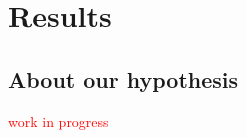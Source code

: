 \section{Results} \label{S:results}
%
\subsection{About our hypothesis} \label{sS:results_hypothesis}
%
\textcolor{red}{work in progress}

\begin{comment}
It is important to highlight that for all model implementations, the visual inspection of trace, trace-rank and autocorrelation plots was performed. Additionally, we also evaluated the Gelman-Rubin diagnostic and effective number of samples \cite{Gelman_et_al_2014}. In all cases, the plots and statistics indicated the parameters achieved convergence, good mixing and lack of serial autocorrelation; all necessary requirements to be able to interpret the model estimates. 

Finally, considering the evidence provided by the previous step, we proceed to make inferences based on the selected models.
\end{comment}

\begin{comment}
	Following the successful and comprehensive analysis in \citet{vanDaal_2020} and \citet{Lesterhuis_2018}, 
	
	Notice the model depicted in panel (a) is interested on (what we can call) \textit{total effects}, i.e. the effects of the hearing characteristics, not independent from the effects of the hearing apparatus (cochlear implant or hearing aid). This is important to understand for two reasons. Since a hearing apparatus is fitted onto a child depending on aspects such as the locus and severity of his(her) hearing impairment \citep{Korver_et_al_2017}: (1) such specific children's characteristics could confound the (beneficial) effects of using specific hearing apparatuses, while (2) because children are selected from a convenient sample, not representative of their respective populations (see section \ref{s_sect:children}), the need to control for such characteristics is paramount, if we seek to obtain effects that can generalize better and beyond our sample\footnote{follow the \textit{notes} folder, to see a graphical though experiment.}.
	
	Considering the previous, we propose the model depicted in panel (b), where we control for the possible confounding variables etiology ($E_{i}$), \textcolor{blue}{as a proxy of locus}, and unaided PTA ($PTA_{i}$), as a proxy for hearing impairment severity. In that sense, the model would estimate (what we can call) the \textit{direct effects} of the hearing apparatus, independent of the children's characteristics.
\end{comment}
%
%
